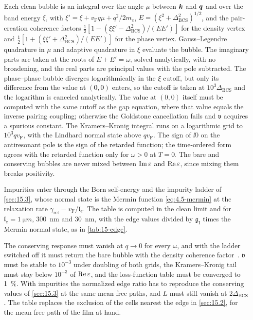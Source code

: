 Each clean bubble is an integral over the angle $\mu$ between $\bm{k}$ and $\bm{q}$ and over the band energy $\xi$, with $\xi' = \xi + v_{\mathrm{F}}q\mu + q^2/2m_e$, $E = (\xi^2 + \Delta_{\mathrm{BCS}}^2)^{1/2}$, and the pair-creation coherence factors $\frac12[1 - (\xi\xi' - \Delta_{\mathrm{BCS}}^2)/(EE')]$ for the density vertex and $\frac12[1 + (\xi\xi' + \Delta_{\mathrm{BCS}}^2)/(EE')]$ for the phase vertex. Gauss--Legendre quadrature in $\mu$ and adaptive quadrature in $\xi$ evaluate the bubble. The imaginary parts are taken at the roots of $E + E' = \omega$, solved analytically, with no broadening, and the real parts are principal values with the pole subtracted. The phase--phase bubble diverges logarithmically in the $\xi$ cutoff, but only its difference from the value at $(0,0)$ enters, so the cutoff is taken at $10^3\Delta_{\mathrm{BCS}}$ and the logarithm is canceled analytically. The value at $(0,0)$ itself must be computed with the same cutoff as the gap equation, where that value equals the inverse pairing coupling; otherwise the Goldstone cancellation fails and $\mathfrak{v}$ acquires a spurious constant. The Kramers--Kronig integral runs on a logarithmic grid to $10^3qv_{\mathrm{F}}$, with the Lindhard normal state above $qv_{\mathrm{F}}$. The sign of $\ii0$ on the antiresonant pole is the sign of the retarded function; the time-ordered form agrees with the retarded function only for $\omega > 0$ at $T = 0$. The bare and conserving bubbles are never mixed between $\operatorname{Im}\varepsilon$ and $\operatorname{Re}\varepsilon$, since mixing them breaks positivity.

Impurities enter through the Born self-energy and the impurity ladder of \cref{sec:15.3}, whose normal state is the Mermin function \cref{eq:4.5-mermin} at the relaxation rate $\gamma_{\mathrm{rel}} = v_{\mathrm{F}}/\mathfrak{l}_e$. The table is computed in the clean limit and for $\mathfrak{l}_e = \SI{1}{\micro m}$, \SI{300}{nm} and \SI{30}{nm}, with the edge values divided by $\mathfrak{g}_{\mathrm{I}}$ times the Mermin normal state, as in \cref{tab:15-edge}.

The conserving response must vanish at $q \to 0$ for every $\omega$, and with the ladder switched off it must return the bare bubble with the density coherence factor~\cite[Eq.~(7)]{gan2026mean}. $\mathfrak{v}$ must be stable to $10^{-3}$ under doubling of both grids, the Kramers--Kronig tail must stay below $10^{-3}$ of $\operatorname{Re}\varepsilon$, and the loss-function table must be converged to \SI{1}{\percent}. With impurities the normalized edge ratio has to reproduce the conserving values of \cref{sec:15.3} at the same mean free paths, and $L$ must still vanish at $2\Delta_{\mathrm{BCS}}$. The table replaces the exclusion of the cells nearest the edge in \cref{sec:15.2}, for the mean free path of the film at hand.

